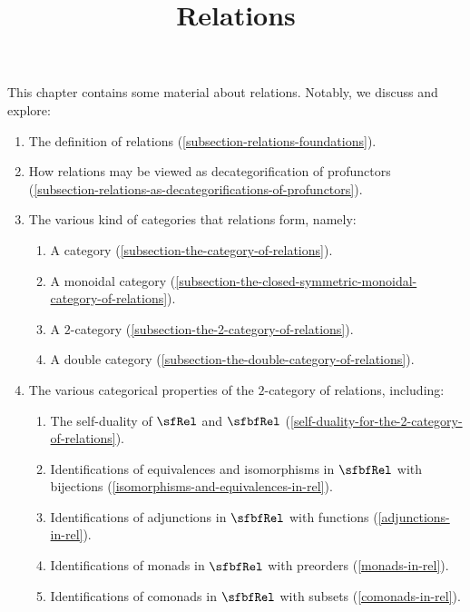 

%



\title{Relations}

\maketitle

\label{section-phantom}

This chapter contains some material about relations. Notably, we discuss and explore:
\begin{enumerate}
    \item The definition of relations (\cref{subsection-relations-foundations}).
    \item How relations may be viewed as decategorification of profunctors (\cref{subsection-relations-as-decategorifications-of-profunctors}).
    \item The various kind of categories that relations form, namely:
        \begin{enumerate}
            \item A category (\cref{subsection-the-category-of-relations}).
            \item A monoidal category (\cref{subsection-the-closed-symmetric-monoidal-category-of-relations}).
            \item A $2$-category (\cref{subsection-the-2-category-of-relations}).
            \item A double category (\cref{subsection-the-double-category-of-relations}).
        \end{enumerate}
    \item The various categorical properties of the $2$-category of relations, including:
        \begin{enumerate}
            \item The self-duality of $\sfRel$ and $\sfbfRel$ (\cref{self-duality-for-the-2-category-of-relations}).
            \item Identifications of equivalences and isomorphisms in $\sfbfRel$ with bijections (\cref{isomorphisms-and-equivalences-in-rel}).
            \item Identifications of adjunctions in $\sfbfRel$ with functions (\cref{adjunctions-in-rel}).
            \item Identifications of monads in $\sfbfRel$ with preorders (\cref{monads-in-rel}).
            \item Identifications of comonads in $\sfbfRel$ with subsets (\cref{comonads-in-rel}).

\end{enumerate}
\end{enumerate}
